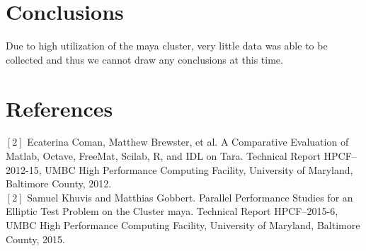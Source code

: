 \documentclass[11pt]{article}
\begin{document}
\section{Conclusions}
Due to high utilization of the maya cluster, very little data was able to be collected and thus we cannot draw any conclusions at this time.
\section*{References}

$\left[2\right]$  Ecaterina Coman, Matthew Brewster, et al. A Comparative Evaluation of Matlab, Octave, FreeMat, Scilab, R, and IDL on Tara. Technical Report HPCF–2012-15, UMBC High Performance Computing Facility, University of Maryland, Baltimore County, 2012.\\
$\left[2\right]$  Samuel Khuvis and Matthias Gobbert. Parallel Performance Studies for an Elliptic Test Problem on the Cluster maya. Technical Report HPCF–2015-6, UMBC High Performance Computing Facility, University of Maryland, Baltimore County, 2015.
\end{document}
